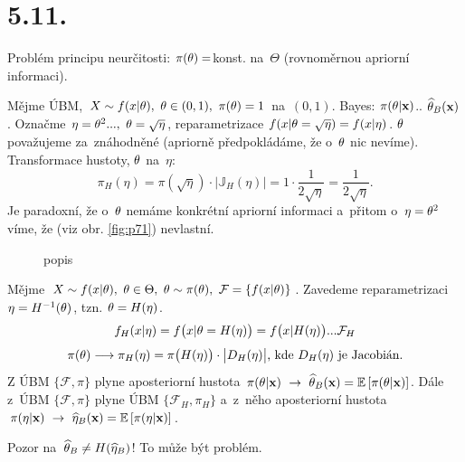 \section{5.11.}
Problém principu neurčitosti: $\pi(\theta)=$konst. na~$\Theta$ (rovnoměrnou apriorní informaci).
\begin{example}
	Mějme ÚBM, $X\sim f(x|\theta),~\theta\in(0,1),~\pi(\theta)=1$ na~$(0,1)$. Bayes: $\pi(\theta|\textbf{x})$.. $\widehat{\theta}_B(\textbf{x})$. Označme $\eta=\theta^2...,~\theta=\sqrt{\eta}$, reparametrizace $f(x|\theta=\sqrt{\eta})=f(x|\eta)$. $\theta$ považujeme za~znáhodněné (apriorně předpokládáme, že o~$\theta$ nic nevíme). Transformace hustoty, $\theta$ na~$\eta$: $$\pi_H(\eta)=\pi(\sqrt{\eta})\cdot\big|\mathbb{J}_H(\eta)\big|=1\cdot\frac{1}{2\sqrt{\eta}}=\frac{1}{2\sqrt{\eta}}.$$
	Je paradoxní, že o~$\theta$ nemáme konkrétní apriorní informaci a~přitom o~$\eta=\theta^2$ víme, že (viz obr. \ref{fig:p71}) nevlastní.

\begin{figure}[h]
	\centering
	\caption{popis}
\end{figure}

\end{example}
\begin{example}
	Mějme $X\sim f(x|\theta),~\theta\in\Theta,~\theta\sim\pi(\theta),~\mathcal{F}=\{f(x|\theta)\}$. Zavedeme reparametrizaci $\eta=H^{-1}(\theta)$, tzn. $\theta=H(\eta)$. 
	$$ f_H(x|\eta)=f\big(x|\theta=H(\eta)\big)=f\big(x|H(\eta)\big)...\mathcal{F}_H$$
	$$\pi(\theta)\longrightarrow \pi_H(\eta)=\pi\big(H(\eta)\big)\cdot\big|D_H(\eta)\big| \text{, kde } D_H(\eta) \text{ je Jacobián.}  $$
	Z ÚBM $\{\mathcal{F},\pi\}$ plyne aposteriorní hustota $\pi(\theta|\textbf{x})~\to~\widehat{\theta}_B(\textbf{x})=\mathbb{E}\left[ \pi(\theta|\textbf{x}) \right]$. Dále z~ÚBM $\{\mathcal{F},\pi\}$ plyne ÚBM $\{\mathcal{F}_H,\pi_H\}$ a~z~něho aposteriorní hustota $\pi(\eta|\textbf{x})~\to~ \widehat{\eta}_B(\textbf{x})=\mathbb{E}\left[ \pi(\eta|\textbf{x}) \right]$. 
	
	Pozor na~$\widehat{\theta}_B\neq H(\widehat{\eta}_B)$! To může být problém.
\end{example}
